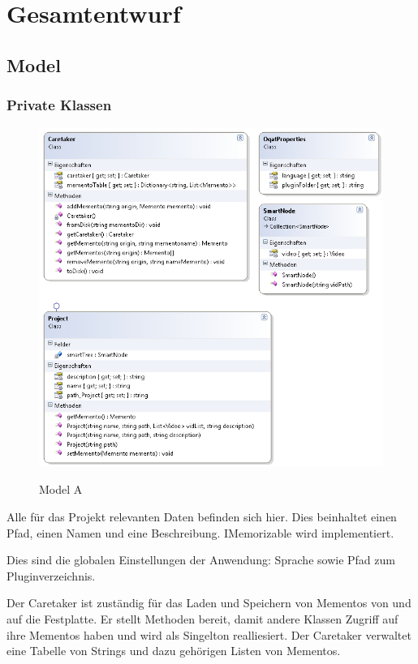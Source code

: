 \chapter{Gesamtentwurf}

\section{Model}

\subsection{Private Klassen}
\begin{figure}[t]
\noindent\includegraphics[scale=1]{bilder/Klassendiagramm/Model.png}
\label{Private Model A}
\caption{Model A}
\end{figure}

Alle für das Projekt relevanten Daten befinden sich hier. Dies beinhaltet einen Pfad,  einen Namen und eine Beschreibung. IMemorizable wird implementiert.


Dies sind die globalen Einstellungen der Anwendung: Sprache sowie Pfad zum Pluginverzeichnis.


Der Caretaker ist zuständig für das Laden und Speichern von Mementos von und auf die Festplatte.
Er stellt Methoden bereit, damit andere Klassen Zugriff auf ihre Mementos haben und wird als Singelton realliesiert. Der Caretaker verwaltet eine Tabelle von Strings und dazu gehörigen Listen von Mementos. 


